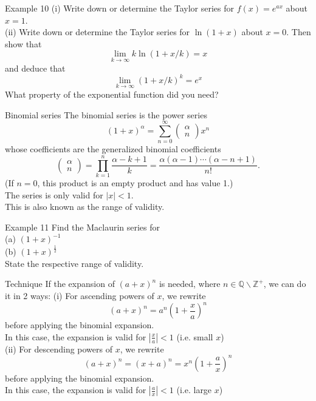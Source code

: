 \documentclass{beamer}
\begin{document}
\begin{frame}{Example 10}
(i) Write down or determine the Taylor series for $f(x)=e^{a x}$ about $x=1$.\\
(ii) Write down or determine the Taylor series for $\ln (1+x)$ about $x=0$. Then show that
$$
\lim _{k \rightarrow \infty} k \ln (1+x / k)=x
$$
and deduce that
$$
\lim _{k \rightarrow \infty}(1+x / k)^k=e^x
$$
What property of the exponential function did you need?
\end{frame}

\begin{frame}{Binomial series}
    The binomial series is the power series
$$
(1+x)^\alpha=\sum_{n=0}^{\infty}\left(\begin{array}{l}
\alpha \\
n
\end{array}\right) x^n
$$
whose coefficients are the generalized binomial coefficients
$$
\left(\begin{array}{l}
\alpha \\
n
\end{array}\right)=\prod_{k=1}^n \frac{\alpha-k+1}{k}=\frac{\alpha(\alpha-1) \cdots(\alpha-n+1)}{n !} .
$$
(If $n=0$, this product is an empty product and has value 1.) \\
The series is only valid for $|x|<1$.\\
This is also known as the range of validity.
\end{frame}

\begin{frame}{Example 11}
Find the Maclaurin series for\\ 
(a) $(1+x)^{-1}$\\
(b) $(1+x)^{\frac{1}{2}}$\\
State the respective range of validity.
\end{frame}

\begin{frame}{Technique}
If the expansion of $(a+x)^n$ is needed, where $n \in \mathbb{Q} \backslash \mathbb{Z}^{+}$, we can do it in 2 ways:
(i) For ascending powers of $x$, we rewrite
$$
(a+x)^n=a^n\left(1+\frac{x}{a}\right)^n
$$
before applying the binomial expansion.\\
In this case, the expansion is valid for $\left|\frac{x}{a}\right|<1$ (i.e. small $x$)\\
(ii) For descending powers of $x$, we rewrite
$$
(a+x)^n=(x+a)^n=x^n\left(1+\frac{a}{x}\right)^n
$$
before applying the binomial expansion.\\
In this case, the expansion is valid for $\left|\frac{a}{x}\right|<1$ (i.e. large $x$)\\
\end{frame}
\end{document}
